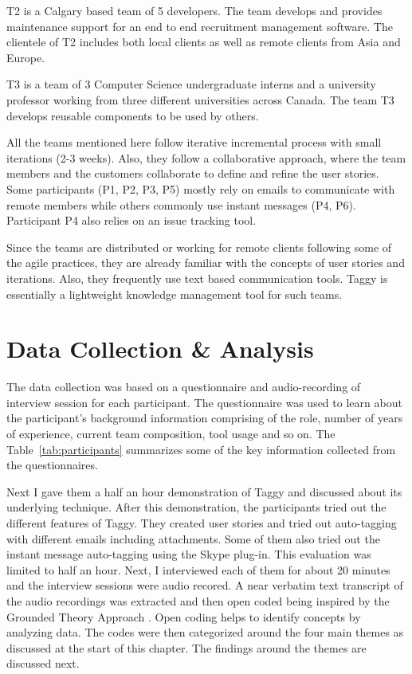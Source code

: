 T2 is a Calgary based team of 5 developers. The team develops and provides maintenance support for an end to end recruitment management software. The clientele of T2 includes both local clients as well as remote clients from Asia and Europe. 

T3 is a team of 3 Computer Science undergraduate interns and a university professor working from three different universities across Canada. The team T3 develops reusable components to be used by others.

All the teams mentioned here follow iterative incremental process with small iterations (2-3 weeks). Also, they follow a collaborative approach, where the team members and the customers collaborate to define and refine the user stories. Some participants (P1, P2, P3, P5) mostly rely on emails to communicate with remote members while others commonly use instant messages (P4, P6). Participant P4 also relies on an issue tracking tool.

Since the teams are distributed or working for remote clients following some of the agile practices, they are already familiar with the concepts of user stories and iterations. Also, they frequently use text based communication tools. Taggy is essentially a lightweight knowledge management tool for such teams.

\section{Data Collection \& Analysis}
The data collection was based on a questionnaire and audio-recording of interview session for each participant. The questionnaire was used to learn about the participant's background information comprising of the role, number of years of experience, current team composition, tool usage and so on. The Table~\ref{tab:participants} summarizes some of the key information collected from the questionnaires.

Next I gave them a half an hour demonstration of Taggy and discussed about its underlying technique. After this demonstration, the participants tried out the different features of Taggy. They created user stories and tried out auto-tagging with different emails including attachments. Some of them also tried out the instant message auto-tagging using the Skype plug-in. This evaluation was limited to half an hour. Next, I interviewed each of them for about 20 minutes and the interview sessions were audio recored. A near verbatim text transcript of the audio recordings was extracted and then open coded being inspired by the Grounded Theory Approach \cite{grounded_theory}. Open coding helps to identify concepts by analyzing data. The codes were then categorized around the four main themes as discussed at the start of this chapter. The findings around the themes are discussed next.

